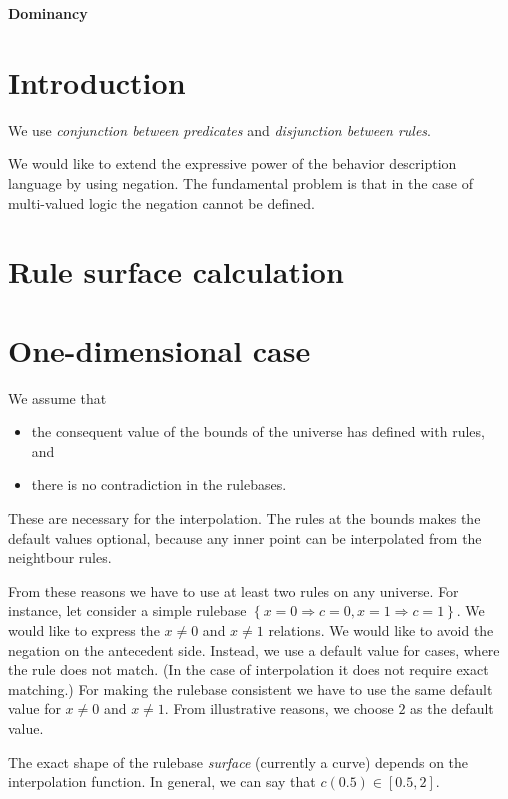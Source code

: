 \documentclass[a4paper,12pt]{article}
\begin{document}
\begin{center}
    \Large \textbf{Dominancy}
\end{center}

\section{Introduction}

We use \textit{conjunction between predicates} and \textit{disjunction between rules}.

We would like to extend the expressive power of the behavior description language by using negation. The fundamental problem is that in the case of multi-valued logic the negation cannot be defined.

\section{Rule surface calculation}

\section{One-dimensional case}

We assume that
\begin{itemize}
\item the consequent value of the bounds of the universe has defined with rules, and
\item there is no contradiction in the rulebases.
\end{itemize}
These are necessary for the interpolation. The rules at the bounds makes the default values optional, because any inner point can be interpolated from the neightbour rules.

From these reasons we have to use at least two rules on any universe. For instance, let consider a simple rulebase $\left\{ x = 0 \Rightarrow c = 0, x = 1 \Rightarrow c = 1 \right\}$. We would like to express the $x \neq 0$ and $x \neq 1$ relations. We would like to avoid the negation on the antecedent side. Instead, we use a default value for cases, where the rule does not match. (In the case of interpolation it does not require exact matching.) For making the rulebase consistent we have to use the same default value for $x \neq 0$ and $x \neq 1$. From illustrative reasons, we choose $2$ as the default value.

The exact shape of the rulebase \textit{surface} (currently a curve) depends on the interpolation function. In general, we can say that $c(0.5) \in [0.5, 2]$.
\end{document}
